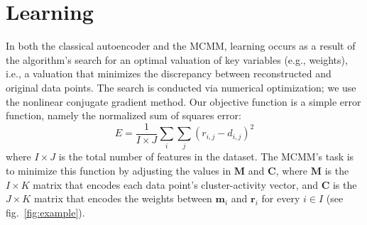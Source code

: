 \section{Learning}
\label{sec:mcmm:learning}


In both the classical autoencoder and the MCMM, learning occurs as a
result of the algorithm's search for an optimal valuation of key variables (e.g., weights), 
i.e., a valuation that minimizes %
the discrepancy between
reconstructed and original data points.  The search is conducted
via %
numerical optimization; we use the nonlinear conjugate gradient method.
%
Our objective function is a simple error function, namely the
normalized sum of squares error:
\begin{equation}
E = \frac{1}{I \times J} \sum_{i} \sum_{j} {(r_{i,j} - d_{i,j})}^2
\end{equation}
 where $I \times J$ is the total number of features in the dataset.
The MCMM's task is to minimize this function by adjusting the
 values in $\mathbf{M}$ and $\mathbf{C}$, where
$\mathbf{M}$ is the $I \times K$ matrix that
encodes each data point's cluster-activity vector, 
and $\mathbf{C}$ is the $J \times K$ matrix that
encodes the weights between $\mathbf{m}_i$ and $\mathbf{r}_i$ for every $i \in I$ (see fig.~\ref{fig:example}). 


